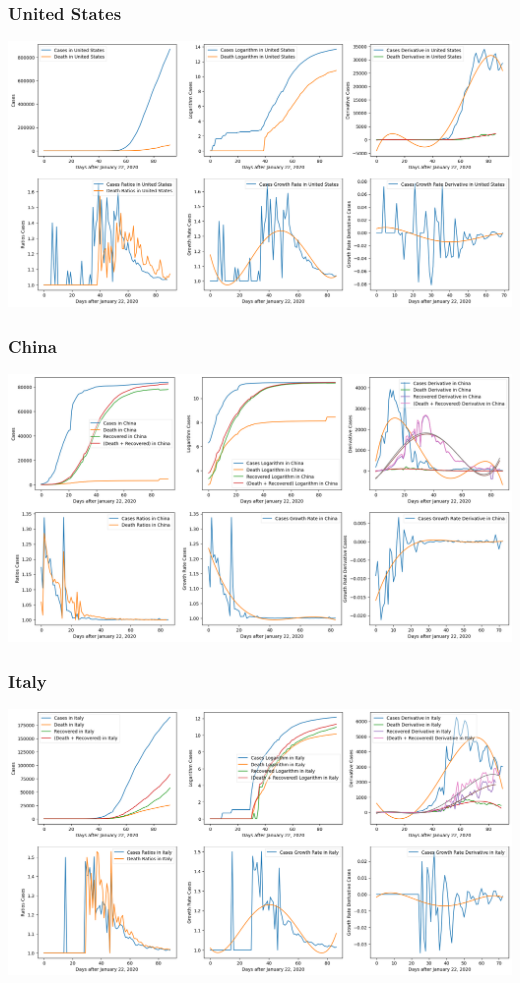 \documentclass{report}
\begin{document}
            \subsubsection{United States}
                \begin{center}
                    \includegraphics[width=\textwidth]{plots/united_states/analyze.png}
                \end{center}
            \subsubsection{China}
                \begin{center}
                    \includegraphics[width=\textwidth]{plots/china/analyze.png}
                \end{center}
            \subsubsection{Italy}
                \begin{center}
                    \includegraphics[width=\textwidth]{plots/italy/analyze.png}
                \end{center}
\end{document}
